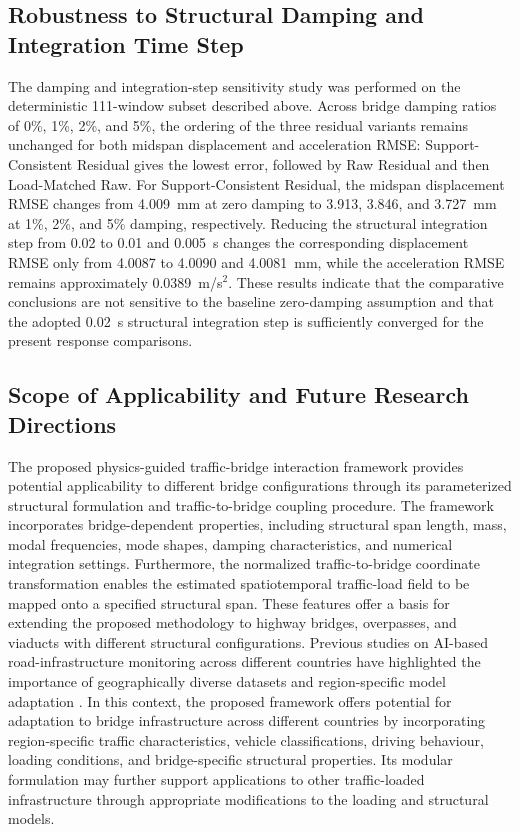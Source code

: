 \documentclass[journal]{IEEEtran}
\begin{document}
\subsection{Robustness to Structural Damping and Integration Time Step}
The damping and integration-step sensitivity study was performed on the deterministic 111-window subset described above. Across bridge damping ratios of 0\%, 1\%, 2\%, and 5\%, the ordering of the three residual variants remains unchanged for both midspan displacement and acceleration RMSE: Support-Consistent Residual gives the lowest error, followed by Raw Residual and then Load-Matched Raw. For Support-Consistent Residual, the midspan displacement RMSE changes from 4.009~mm at zero damping to 3.913, 3.846, and 3.727~mm at 1\%, 2\%, and 5\% damping, respectively. Reducing the structural integration step from 0.02 to 0.01 and 0.005~s changes the corresponding displacement RMSE only from 4.0087 to 4.0090 and 4.0081~mm, while the acceleration RMSE remains approximately 0.0389~m/s$^2$. These results indicate that the comparative conclusions are not sensitive to the baseline zero-damping assumption and that the adopted 0.02~s structural integration step is sufficiently converged for the present response comparisons.



\subsection{Scope of Applicability and Future Research Directions}
\label{sec:scope_applicability}

The proposed physics-guided traffic-bridge interaction framework provides potential applicability to different bridge configurations through its parameterized structural formulation and traffic-to-bridge coupling procedure. The framework incorporates bridge-dependent properties, including structural span length, mass, modal frequencies, mode shapes, damping characteristics, and numerical integration settings. Furthermore, the normalized traffic-to-bridge coordinate transformation enables the estimated spatiotemporal traffic-load field to be mapped onto a specified structural span. These features offer a basis for extending the proposed methodology to highway bridges, overpasses, and viaducts with different structural configurations. 
Previous studies on AI-based road-infrastructure monitoring
across different countries have highlighted the importance
of geographically diverse datasets and region-specific
model adaptation \cite{arya2024crosscountry}.
In this context, the proposed framework offers potential
for adaptation to bridge infrastructure across different
countries by incorporating region-specific traffic
characteristics, vehicle classifications, driving behaviour,
loading conditions, and bridge-specific structural properties.
Its modular formulation may further support applications to other traffic-loaded infrastructure through appropriate modifications to the loading and structural models.
\end{document}
